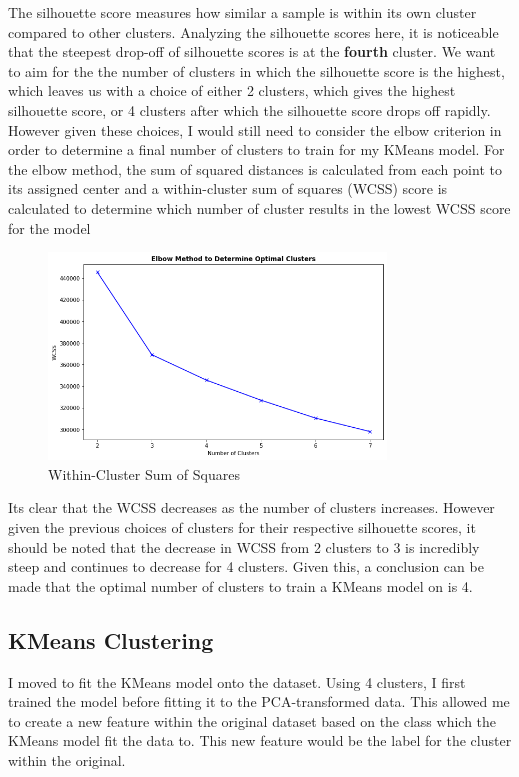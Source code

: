 \documentclass[12pt]{article}
\begin{document}
\noindent
The silhouette score measures how similar a sample is within its own cluster compared to other clusters. Analyzing the silhouette scores here, it is noticeable that the steepest drop-off of silhouette scores is at the \textbf{fourth} cluster. We want to aim for the the number of clusters in which the silhouette score is the highest, which leaves us with a choice of either 2 clusters, which gives the highest silhouette score, or 4 clusters after which the silhouette score drops off rapidly. \\ 

\noindent
However given these choices, I would still need to consider the elbow criterion in order to determine a final number of clusters to train for my KMeans model. For the elbow method, the sum of squared distances is calculated from each point to its assigned center and a within-cluster sum of squares (WCSS) score is calculated to determine which number of cluster results in the lowest WCSS score for the  model


\begin{figure}[htbp]
  \centering
  \vspace{-0.075cm}
  \includegraphics[width=0.8\textwidth]{kmeans_elbow.png}
  \caption{Within-Cluster Sum of Squares}
  \label{KMeans Elbow Criterion WCSS}
\end{figure}

\newpage \noindent
Its clear that the WCSS decreases as the number of clusters increases. However given the previous choices of clusters for their respective silhouette scores, it should be noted that the decrease in WCSS from 2 clusters to 3 is incredibly steep and continues to decrease for 4 clusters. Given this, a conclusion can be made that the optimal number of clusters to train a KMeans model on is 4.


\subsection*{\textbf{KMeans Clustering}}
I moved to fit the KMeans model onto the dataset. Using 4 clusters, I first trained the model before fitting it to the PCA-transformed data. This allowed me to create a new feature within the original dataset based on the class which the KMeans model fit the data to. This new feature would be the label for the cluster within the original. \\
\end{document}
